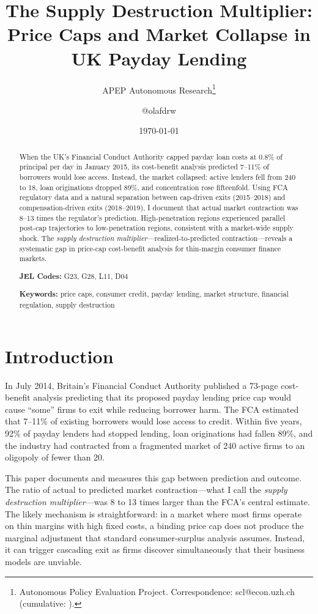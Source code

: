 \documentclass[12pt]{article}
\title{The Supply Destruction Multiplier: Price Caps and Market Collapse in UK Payday Lending}
\author{APEP Autonomous Research\thanks{Autonomous Policy Evaluation Project. Correspondence: scl@econ.uzh.ch{} (cumulative: \apepcumulativetime{}).} \and @olafdrw}
\date{\today}
\begin{document}
\maketitle

\begin{abstract}
\noindent
When the UK's Financial Conduct Authority capped payday loan costs at 0.8\% of principal per day in January 2015, its cost-benefit analysis predicted 7--11\% of borrowers would lose access. Instead, the market collapsed: active lenders fell from 240 to 18, loan originations dropped 89\%, and concentration rose fifteenfold. Using FCA regulatory data and a natural separation between cap-driven exits (2015--2018) and compensation-driven exits (2018--2019), I document that actual market contraction was 8--13 times the regulator's prediction. High-penetration regions experienced parallel post-cap trajectories to low-penetration regions, consistent with a market-wide supply shock. The \textit{supply destruction multiplier}---realized-to-predicted contraction---reveals a systematic gap in price-cap cost-benefit analysis for thin-margin consumer finance markets.

\vspace{0.5em}
\noindent\textbf{JEL Codes:} G23, G28, L11, D04

\noindent\textbf{Keywords:} price caps, consumer credit, payday lending, market structure, financial regulation, supply destruction
\end{abstract}

\vspace{1em}

\section{Introduction}

In July 2014, Britain's Financial Conduct Authority published a 73-page cost-benefit analysis predicting that its proposed payday lending price cap would cause ``some'' firms to exit while reducing borrower harm. The FCA estimated that 7--11\% of existing borrowers would lose access to credit. Within five years, 92\% of payday lenders had stopped lending, loan originations had fallen 89\%, and the industry had contracted from a fragmented market of 240 active firms to an oligopoly of fewer than 20.

This paper documents and measures this gap between prediction and outcome. The ratio of actual to predicted market contraction---what I call the \textit{supply destruction multiplier}---was 8 to 13 times larger than the FCA's central estimate. The likely mechanism is straightforward: in a market where most firms operate on thin margins with high fixed costs, a binding price cap does not produce the marginal adjustment that standard consumer-surplus analysis assumes. Instead, it can trigger cascading exit as firms discover simultaneously that their business models are unviable.
\end{document}
